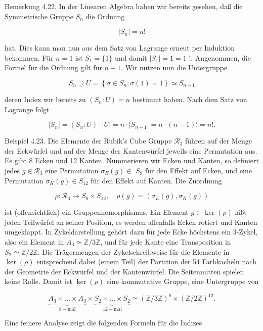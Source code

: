 \documentclass[10pt, letterpaper]{article}
\begin{document}
Bemerkung 4.22. In der Linearen Algebra haben wir bereits gesehen, daß die Symmetrische Gruppe $S_{n}$ die Ordnung

$$
\left|S_{n}\right|=n!
$$

hat. Dies kann man nun aus dem Satz von Lagrange erneut per Induktion bekommen. Für $n=1$ ist $S_{1}=\{1\}$ und damit $\left|S_{1}\right|=1=1$ !. Angenommen, die Formel für die Ordnung gilt für $n-1$. Wir nutzen nun die Untergruppe

$$
S_{n} \supseteq U=\left\{\sigma \in S_{n} ; \sigma(1)=1\right\} \simeq S_{n-1}
$$

deren Index wir bereits zu $\left(S_{n}: U\right)=n$ bestimmt haben. Nach dem Satz von Lagrange folgt

$$
\left|S_{n}\right|=\left(S_{n}: U\right) \cdot|U|=n \cdot\left|S_{n-1}\right|=n \cdot(n-1)!=n!.
$$

Beispiel 4.23. Die Elemente der Rubik's Cube Gruppe $\mathscr{R}_{3}$ führen auf der Menge der Eckwürfel und auf der Menge der Kantenwürfel jeweils eine Permutation aus. Es gibt 8 Ecken und 12 Kanten. Nummerieren wir Ecken und Kanten, so definiert jedes $g \in \mathscr{R}_{3}$ eine Permutation $\sigma_{E}(g) \in$ $S_{8}$ für den Effekt auf Ecken, und eine Permutation $\sigma_{K}(g) \in S_{12}$ für den Effekt auf Kanten. Die Zuordnung

$$
\rho: \mathscr{R}_{3} \rightarrow S_{8} \times S_{12}, \quad \rho(g)=\left(\sigma_{E}(g), \sigma_{K}(g)\right)
$$

ist (offensichtlich) ein Gruppenhomorphismus. Ein Element $g \in \operatorname{ker}(\rho)$ läßt jeden Teilwürfel an seiner Position, es werden allenfalls Ecken rotiert und Kanten umgeklappt. In Zykeldarstellung gehört dazu für jede Ecke höchstens ein 3-Zykel, also ein Element in $A_{3} \simeq \mathbb{Z} / 3 \mathbb{Z}$, und für jede Kante eine Transposition in $S_{2} \simeq \mathbb{Z} / 2 \mathbb{Z}$. Die Trägermengen der Zykelschreibweise für die Elemente in $\operatorname{ker}(\rho)$ entsprechend dabei (einem Teil) der Partition der 54 Farbkacheln nach der Geometrie der Eckwürfel und der Kantenwürfel. Die Seitenmitten spielen keine Rolle. Damit ist $\operatorname{ker}(\rho)$ eine kommutative Gruppe, eine Untergruppe von

$$
\underbrace{A_{3} \times \ldots \times A_{3}}_{8-\mathrm{mal}} \times \underbrace{S_{2} \times \ldots \times S_{2}}_{12-\mathrm{mal}} \simeq(\mathbb{Z} / 3 \mathbb{Z})^{8} \times(\mathbb{Z} / 2 \mathbb{Z})^{12} .
$$

Eine feinere Analyse zeigt die folgenden Formeln für die Indizes
\end{document}
